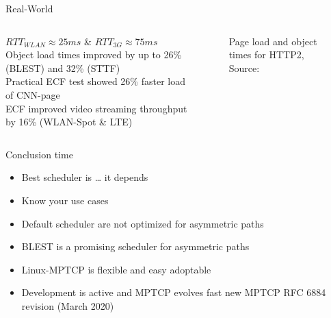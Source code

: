 \documentclass{beamer}
\begin{document}
\begin{frame}{Real-World}
  \begin{columns}
    \begin{column}{0.3\textwidth}
      \small
        \bull{} \(RTT_{WLAN} \approx 25ms\) \& \(RTT_{3G} \approx 75ms\)\\
        \vspace{0.2cm}
        \bull{} Object load times improved by up to 26\% (BLEST) and 32\% (STTF)\\
        \vspace{0.2cm}
        \bull{} Practical ECF test showed 26\% faster load of CNN-page\\
        \vspace{0.2cm}
        \bull{} ECF improved video streaming throughput by 16\% (WLAN-Spot \& LTE)
    \end{column}
    \begin{column}{0.7\textwidth}
      \vspace{-0.8cm}
      \begin{figure}
        \centering
        \caption{\small Page load and object times for HTTP2, \textcolor{uos-grey-full}{Source: {\cite{lowlatschedulers}}}}
      \end{figure}
    \end{column}
  \end{columns}
\end{frame}


\begin{frame}{Conclusion time}
  \begin{center}
    \begin{itemize}
      \setlength\itemsep{1.2em}
      \item \textcolor{uos-red-full}{\Large Best scheduler is \dots{} it depends}\\%
      \item Know your use cases\\%
      \item Default scheduler are not optimized for asymmetric paths\\%
      \item BLEST is a promising scheduler for asymmetric paths\\%
      \item Linux-MPTCP is flexible and easy adoptable\\%
      \item Development is active and MPTCP evolves fast new MPTCP RFC 6884 revision (March 2020)
    \end{itemize}
  \end{center}
\end{frame}
\end{document}
